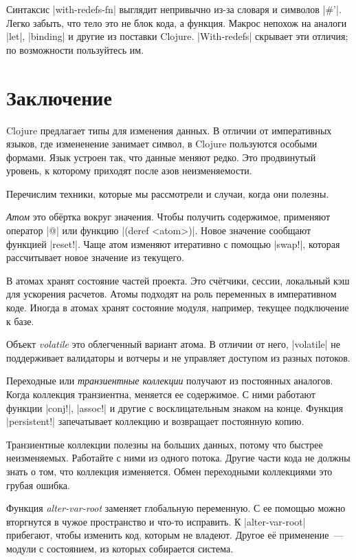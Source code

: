 Синтаксис \spverb|with-redefs-fn| выглядит непривычно из-за словаря и символов
\spverb|#'|. Легко забыть, что тело это не блок кода, а функция. Макрос непохож
на аналоги \spverb|let|, \spverb|binding| и другие из поставки Clojure.
\spverb|With-redefs| скрывает эти отличия; по возможности пользуйтесь им.

\section{Заключение}

Clojure предлагает типы для изменения данных. В отличии от императивных языков,
где измененение занимает символ, в Clojure пользуются особыми формами. Язык
устроен так, что данные меняют редко. Это продвинутый уровень, к которому
приходят после азов неизменяемости.

Перечислим техники, которые мы рассмотрели и случаи, когда они полезны.

\emph{Атом} это об\"{е}ртка вокруг значения. Чтобы получить содержимое, применяют
оператор \spverb|@| или функцию \spverb|(deref <atom>)|. Новое значение сообщают
функцией \spverb|reset!|. Чаще атом изменяют итеративно с помощью
\spverb|swap!|, которая рассчитывает новое значение из текущего.

В атомах хранят состояние частей проекта. Это сч\"{е}тчики, сессии, локальный кэш
для ускорения расчетов. Атомы подходят на роль переменных в императивном
коде. Иногда в атомах хранят состояние модуля, например, текущее подключение к
базе.

Объект \emph{volatile} это облегченный вариант атома. В отличии от него,
\spverb|volatile| не поддерживает валидаторы и вотчеры и не управляет доступом
из разных потоков.

Переходные или \emph{транзиентные коллекции} получают из постоянных
аналогов. Когда коллекция транзиентна, меняется ее содержимое. С ними работают
функции \spverb|conj!|, \spverb|assoc!| и другие с восклицательным знаком на
конце. Функция \spverb|persistent!| запечатывает коллекцию и возвращает
постоянную копию.

Транзиентные коллекции полезны на больших данных, потому что быстрее
неизменяемых. Работайте с ними из одного потока. Другие части кода не должны
знать о том, что коллекция изменяется. Обмен переходными коллекциями это грубая
ошибка.

Функция \emph{alter-var-root} заменяет глобальную переменную. С ее помощью можно
вторгнутся в чужое пространство и что-то исправить. К \spverb|alter-var-root|
прибегают, чтобы изменить код, которым не владеют. Другое е\"{е} применение~---
модули с состоянием, из которых собирается система.

